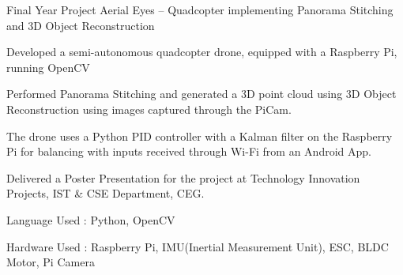 

\begin{cventries}

  \cventry
    {Final Year Project} %
    {Aerial Eyes – Quadcopter implementing Panorama Stitching and 3D Object Reconstruction} %
    {} %
    {} %
    {
      \begin{cvitems} %
        \item {Developed a semi-autonomous quadcopter drone, equipped with a Raspberry Pi, running OpenCV}
        \item {Performed Panorama Stitching and generated a 3D point cloud using 3D Object Reconstruction using images captured through the PiCam. }
        \item {The drone uses a Python PID controller with a Kalman filter on the Raspberry Pi for balancing with inputs received through Wi-Fi from an Android App. }
        \item {Delivered a Poster Presentation for the project at Technology Innovation Projects, IST \& CSE Department, CEG.}
        \item {Language Used : Python, OpenCV}
        \item {Hardware Used : Raspberry Pi, IMU(Inertial Measurement Unit), ESC, BLDC Motor, Pi Camera}
      \end{cvitems}
    }

\end{cventries}
